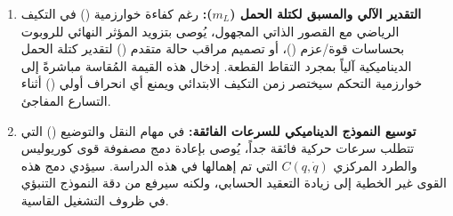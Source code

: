 \begin{enumerate}
    \item \textbf{التقدير الآلي والمسبق لكتلة الحمل ($m_L$):} 
    رغم كفاءة خوارزمية () في التكيف الرياضي مع القصور الذاتي المجهول، يُوصى بتزويد المؤثر النهائي للروبوت بحساسات قوة/عزم ()، أو تصميم مراقب حالة متقدم () لتقدير كتلة الحمل الديناميكية آلياً بمجرد التقاط القطعة. إدخال هذه القيمة المُقاسة مباشرةً إلى خوارزمية التحكم سيختصر زمن التكيف الابتدائي ويمنع أي انحراف أولي () أثناء التسارع المفاجئ.

    \item \textbf{توسيع النموذج الديناميكي للسرعات الفائقة:}
    في مهام النقل والتوضيع () التي تتطلب سرعات حركية فائقة جداً، يُوصى بإعادة دمج مصفوفة قوى كوريوليس والطرد المركزي $C(q, \dot{q})$ التي تم إهمالها في هذه الدراسة. سيؤدي دمج هذه القوى غير الخطية إلى زيادة التعقيد الحسابي، ولكنه سيرفع من دقة النموذج التنبؤي في ظروف التشغيل القاسية.
\end{enumerate}